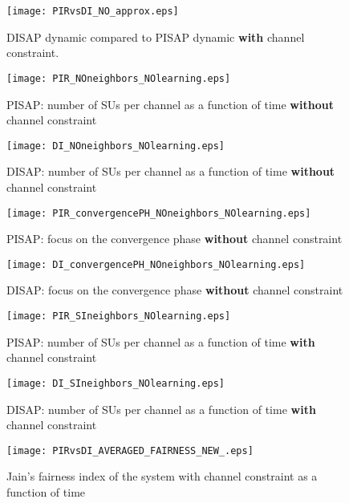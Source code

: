 \documentclass[12pt, onecolumn]{IEEEtran}
\theoremstyle{plain}
\theoremstyle{definition}
\begin{document}
\begin{figure}\centering
\texttt{[image: PIRvsDI\_NO\_approx.eps]}
\caption{DISAP dynamic compared to PISAP dynamic \textbf{with} channel constraint.}
\label{fig:DIvsPIR}
\end{figure}

\begin{figure*}
\begin{minipage}[r]{0.49\linewidth}
\texttt{[image: PIR\_NOneighbors\_NOlearning.eps]}
\caption{PISAP: number of SUs per channel as a function of time \textbf{without} channel constraint}
\label{fig:pirSuxCHwoCC}
\end{minipage} \hfill
\begin{minipage}[c]{0.49\linewidth}
\texttt{[image: DI\_NOneighbors\_NOlearning.eps]}
\caption{DISAP: number of SUs per channel as a function of time \textbf{without} channel constraint}
\label{fig:diSuxCHwoCC}
\end{minipage}\hfill
\end{figure*}


\begin{figure*}
\begin{minipage}[r]{0.49\linewidth}
\texttt{[image: PIR\_convergencePH\_NOneighbors\_NOlearning.eps]}
\caption{PISAP: focus on the convergence phase \textbf{without} channel constraint}
\label{fig:PIR_convergencePH}
\end{minipage} \hfill
\begin{minipage}[c]{0.49\linewidth}
\texttt{[image: DI\_convergencePH\_NOneighbors\_NOlearning.eps]}
\caption{DISAP: focus on the convergence phase \textbf{without} channel constraint}
\label{fig:DI_convergencePH}
\end{minipage}\hfill
\vspace{0.5cm}
\end{figure*}

\begin{figure*} \begin{minipage}[r]{0.49\linewidth}
\texttt{[image: PIR\_SIneighbors\_NOlearning.eps]}
\caption{PISAP: number of SUs per channel as a function of time \textbf{with} channel constraint}
\label{fig:PIR_SIneighbors_NOlearning}
\end{minipage} \hfill
\begin{minipage}[c]{0.49\linewidth}
\texttt{[image: DI\_SIneighbors\_NOlearning.eps]}
\caption{DISAP: number of SUs per channel as a function of time \textbf{with} channel constraint}
\label{fig:DI_SIneighbors_NOlearning}
\end{minipage}\hfill
\vspace{0.5cm}
\end{figure*}


\begin{figure}[tbp]
 \centering
\texttt{[image: PIRvsDI\_AVERAGED\_FAIRNESS\_NEW\_.eps]}
\vspace{-0.5cm}
\caption{Jain's fairness index of the system with channel constraint as a function of time}
\label{fig:jain}
\end{figure}
\end{document}
